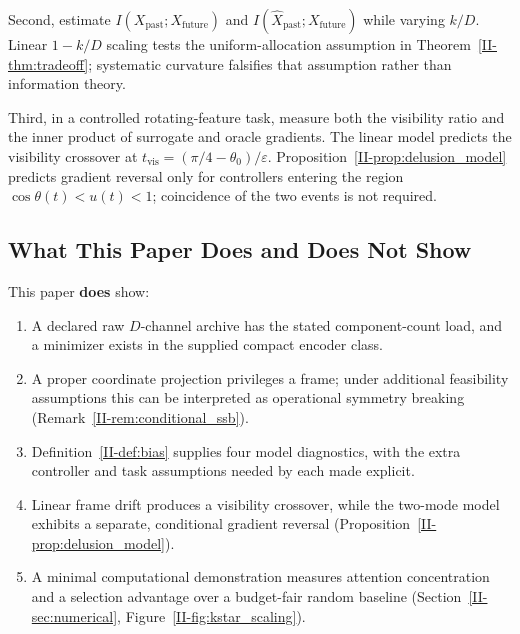 \documentclass[12pt,a4paper,openany]{book}
\begin{document}
Second, estimate
$I(X_{\mathrm{past}};X_{\mathrm{future}})$ and
$I(\hat X_{\mathrm{past}};X_{\mathrm{future}})$ while varying $k/D$.
Linear $1-k/D$ scaling tests the uniform-allocation assumption in
Theorem~\ref{II-thm:tradeoff}; systematic curvature falsifies that
assumption rather than information theory.

Third, in a controlled rotating-feature task, measure both the visibility
ratio and the inner product of surrogate and oracle gradients.  The
linear model predicts the visibility crossover at
$t_{\mathrm{vis}}=(\pi/4-\theta_0)/\varepsilon$.  Proposition~\ref{II-prop:delusion_model}
predicts gradient reversal only for controllers entering the region
$\cos\theta(t)<u(t)<1$; coincidence of the two events is not required.

\subsection{What This Paper Does and Does Not Show}
\label{II-subsec:claims}

This paper \textbf{does} show:
\begin{enumerate}
\item A declared raw $D$-channel archive has the stated component-count
  load, and a minimizer exists in the supplied compact encoder class.
\item A proper coordinate projection privileges a frame; under additional
  feasibility assumptions this can be interpreted as operational symmetry
  breaking (Remark~\ref{II-rem:conditional_ssb}).
\item Definition~\ref{II-def:bias} supplies four model diagnostics, with the
  extra controller and task assumptions needed by each made explicit.
\item Linear frame drift produces a visibility crossover, while the
  two-mode model exhibits a separate, conditional gradient reversal
  (Proposition~\ref{II-prop:delusion_model}).
\item A minimal computational demonstration measures attention
  concentration and a selection advantage over a budget-fair random baseline
  (Section~\ref{II-sec:numerical},
  Figure~\ref{II-fig:kstar_scaling}).
\end{enumerate}
\end{document}
